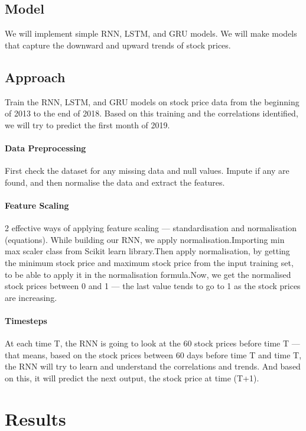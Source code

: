 \documentclass{article}
\begin{document}
\subsection{Model}
We will implement simple RNN, LSTM, and GRU models. We will make models that capture the downward and upward trends of stock prices. 
\subsection{Approach}
Train the RNN, LSTM, and GRU models on stock price data from the beginning of 2013 to the end of 2018. Based on this training and the correlations identified, we will try to predict the first month of 2019.
\paragraph{Data Preprocessing} First check the dataset for any missing data and null values. Impute if any are found, and then normalise the data and extract the features.
\paragraph{Feature Scaling} 2 effective ways of applying feature scaling — standardisation and normalisation (equations). While building our RNN, we apply normalisation.Importing min max scaler class from Scikit learn library.Then apply normalisation, by getting the minimum stock price and maximum stock price from the input training set, to be able to apply it in the normalisation formula.Now, we get the normalised stock prices between 0 and 1 — the last value tends to go to 1 as the stock prices are increasing.
\paragraph{Timesteps}
At each time T, the RNN is going to look at the 60 stock prices before time T — that means, based on the stock prices between 60 days before time T and time T, the RNN will try to learn and understand the correlations and trends. And based on this, it will predict the next output, the stock price at time (T+1).
\section{Results}
\end{document}
